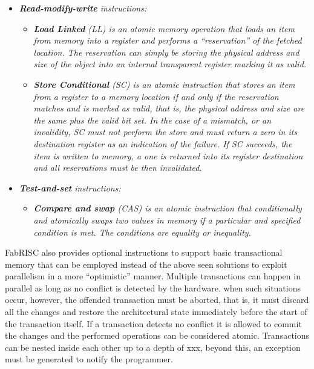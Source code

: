\documentclass{article}
\begin{document}
            \begin{itemize}

                \item \textit{\textbf{Read-modify-write} instructions:}

                \begin{itemize}

                    \item \textit{\textbf{Load Linked} (LL) is an atomic memory operation that loads an item from memory into a register and performs a ``reservation'' of the fetched location. The reservation can simply be storing the physical address and size of the object into an internal transparent register marking it as valid.}

                    \item \textit{\textbf{Store Conditional} (SC) is an atomic instruction that stores an item from a register to a memory location if and only if the reservation matches and is marked as valid, that is, the physical address and size are the same plus the valid bit set. In the case of a mismatch, or an invalidity, SC must not perform the store and must return a zero in its destination register as an indication of the failure. If SC succeeds, the item is written to memory, a one is returned into its register destination and all reservations must be then invalidated.}

                \end{itemize}

                \item \textit{\textbf{Test-and-set} instructions:}

                \begin{itemize}

                    \item \textit{\textbf{Compare and swap} (CAS) is an atomic instruction that conditionally and atomically swaps two values in memory if a particular and specified condition is met. The conditions are equality or inequality.}

                \end{itemize}

            \end{itemize}

            FabRISC also provides optional instructions to support basic transactional memory that can be employed instead of the above seen solutions to exploit parallelism in a more ``optimistic'' manner. Multiple transactions can happen in parallel as long as no conflict is detected by the hardware. when such situations occur, however, the offended transaction must be aborted, that is, it must discard all the changes and restore the architectural state immediately before the start of the transaction itself. If a transaction detects no conflict it is allowed to commit the changes and the performed operations can be considered atomic. Transactions can be nested inside each other up to a depth of xxx, beyond this, an exception must be generated to notify the programmer.
\end{document}
